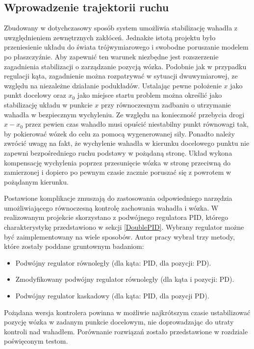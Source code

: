 \documentclass[12pt, oneside]{report}
\theoremstyle{definition}
\begin{document}
\subsection{Wprowadzenie trajektorii ruchu}
Zbudowany w dotychczasowy sposób system umożliwia stabilizację wahadła z uwzględnieniem zewnętrznych zakłóceń. Jednakże istotą projektu było przeniesienie układu do świata trójwymiarowego i swobodne poruszanie modelem po płaszczyźnie. Aby zapewnić ten warunek niezbędne jest rozszerzenie zagadnienia stabilizacji o zarządzanie pozycją wózka. Podobnie jak w przypadku regulacji kąta, zagadnienie można rozpatrywać w sytuacji dwuwymiarowej, ze względu na niezależne działanie podukładów. Ustalając pewne położenie $x$ jako punkt docelowy oraz $x_0$ jako miejsce startu problem można określić jako stabilizację układu w punkcie $x$ przy równoczesnym zadbaniu o utrzymanie wahadła w bezpiecznym wychyleniu. Ze względu na konieczność przebycia drogi $x - x_0$ przez pewien czas wahadło musi opuścić niestabilny punkt równowagi tak, by pokierować wózek do celu za pomocą wygenerowanej siły. Ponadto należy zwrócić uwagę na fakt, że wychylenie wahadła w kierunku docelowego punktu nie zapewni bezpośredniego ruchu podstawy w pożądaną stronę. Układ wykona kompensację wychylenia poprzez przesunięcie wózka w stronę przeciwną do zamierzonej i dopiero po pewnym czasie zacznie poruszać się z powrotem w pożądanym kierunku. 

Postawione komplikacje zmuszają do zastosowania odpowiedniego narzędzia umożliwiającego równoczesną kontrolę zachowania wahadła i wózka. W realizowanym projekcie skorzystano z podwójnego regulatora PID, którego charakterystykę przedstawiono w sekcji \ref{DoublePID}. Wybrany regulator możne być zaimplementowany na wiele sposobów. Autor pracy wybrał trzy metody, które zostały poddane gruntownym badaniom:
\begin{itemize}
\item Podwójny regulator równoległy (dla kąta: PID, dla pozycji: PD).
\item Zmodyfikowany podwójny regulator równoległy (dla kąta i pozycji: PD).
\item Podwójny regulator kaskadowy (dla kąta: PID, dla pozycji PD).
\end{itemize}

Pożądana wersja kontrolera powinna w możliwie najkrótszym czasie ustabilizować pozycję wózka w zadanym punkcie docelowym, nie doprowadzając do utraty kontroli nad wahadłem. Porównanie rozwiązań zostało przedstawione w rozdziale poświęconym testom. 
\end{document}
